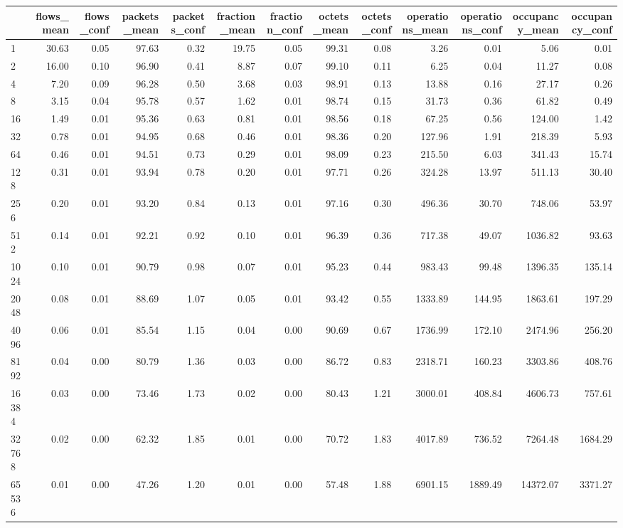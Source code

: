 \begin{tabular}{lrrrrrrrrrrrr}
\toprule
 & flows_mean & flows_conf & packets_mean & packets_conf & fraction_mean & fraction_conf & octets_mean & octets_conf & operations_mean & operations_conf & occupancy_mean & occupancy_conf \\
\midrule
1 & 30.63 & 0.05 & 97.63 & 0.32 & 19.75 & 0.05 & 99.31 & 0.08 & 3.26 & 0.01 & 5.06 & 0.01 \\
2 & 16.00 & 0.10 & 96.90 & 0.41 & 8.87 & 0.07 & 99.10 & 0.11 & 6.25 & 0.04 & 11.27 & 0.08 \\
4 & 7.20 & 0.09 & 96.28 & 0.50 & 3.68 & 0.03 & 98.91 & 0.13 & 13.88 & 0.16 & 27.17 & 0.26 \\
8 & 3.15 & 0.04 & 95.78 & 0.57 & 1.62 & 0.01 & 98.74 & 0.15 & 31.73 & 0.36 & 61.82 & 0.49 \\
16 & 1.49 & 0.01 & 95.36 & 0.63 & 0.81 & 0.01 & 98.56 & 0.18 & 67.25 & 0.56 & 124.00 & 1.42 \\
32 & 0.78 & 0.01 & 94.95 & 0.68 & 0.46 & 0.01 & 98.36 & 0.20 & 127.96 & 1.91 & 218.39 & 5.93 \\
64 & 0.46 & 0.01 & 94.51 & 0.73 & 0.29 & 0.01 & 98.09 & 0.23 & 215.50 & 6.03 & 341.43 & 15.74 \\
128 & 0.31 & 0.01 & 93.94 & 0.78 & 0.20 & 0.01 & 97.71 & 0.26 & 324.28 & 13.97 & 511.13 & 30.40 \\
256 & 0.20 & 0.01 & 93.20 & 0.84 & 0.13 & 0.01 & 97.16 & 0.30 & 496.36 & 30.70 & 748.06 & 53.97 \\
512 & 0.14 & 0.01 & 92.21 & 0.92 & 0.10 & 0.01 & 96.39 & 0.36 & 717.38 & 49.07 & 1036.82 & 93.63 \\
1024 & 0.10 & 0.01 & 90.79 & 0.98 & 0.07 & 0.01 & 95.23 & 0.44 & 983.43 & 99.48 & 1396.35 & 135.14 \\
2048 & 0.08 & 0.01 & 88.69 & 1.07 & 0.05 & 0.01 & 93.42 & 0.55 & 1333.89 & 144.95 & 1863.61 & 197.29 \\
4096 & 0.06 & 0.01 & 85.54 & 1.15 & 0.04 & 0.00 & 90.69 & 0.67 & 1736.99 & 172.10 & 2474.96 & 256.20 \\
8192 & 0.04 & 0.00 & 80.79 & 1.36 & 0.03 & 0.00 & 86.72 & 0.83 & 2318.71 & 160.23 & 3303.86 & 408.76 \\
16384 & 0.03 & 0.00 & 73.46 & 1.73 & 0.02 & 0.00 & 80.43 & 1.21 & 3000.01 & 408.84 & 4606.73 & 757.61 \\
32768 & 0.02 & 0.00 & 62.32 & 1.85 & 0.01 & 0.00 & 70.72 & 1.83 & 4017.89 & 736.52 & 7264.48 & 1684.29 \\
65536 & 0.01 & 0.00 & 47.26 & 1.20 & 0.01 & 0.00 & 57.48 & 1.88 & 6901.15 & 1889.49 & 14372.07 & 3371.27 \\

\end{tabular}

